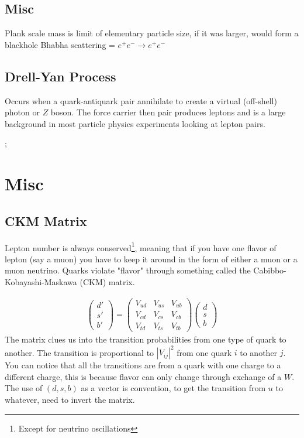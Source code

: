 \subsection{Misc}

Plank scale mass is limit of elementary particle size, if it was larger, would form a blackhole
Bhabha scattering = $e^+e^-\rightarrow e^+e^-$

\subsection{Drell-Yan Process}
Occurs when a quark-antiquark pair annihilate to create a virtual (off-shell) photon or $Z$ boson. The force carrier then pair produces leptons and is a large background in most particle physics experiments looking at lepton pairs.


\centerline{
;
}
\section{Misc}

\subsection{CKM Matrix}
Lepton number is always conserved\footnote{Except for neutrino oscillations}, meaning that if you have one flavor of lepton (say a muon) you have to keep it around in the form of either a muon or a muon neutrino. Quarks violate "flavor" through something called the Cabibbo-Kobayashi-Maskawa (CKM) matrix.

\begin{align}
\begin{pmatrix}
d'\\
s'\\
b'
\end{pmatrix} = \begin{pmatrix}
V_{ud}&V_{us}&V_{ub}\\
V_{cd}&V_{cs}&V_{cb}\\
V_{td}&V_{ts}&V_{tb}
\end{pmatrix} \begin{pmatrix}
d\\
s\\
b
\end{pmatrix}
\end{align}
The matrix clues us into the transition probabilities from one type of quark to another. The transition is proportional to $|V_{ij}|^2$ from one quark $i$ to another $j$. You can notice that all the transitions are from a quark with one charge to a different charge, this is because flavor can only change through exchange of a $W$. The use of $(d,s,b)$ as a vector is convention, to get the transition from $u$ to whatever, need to invert the matrix.

